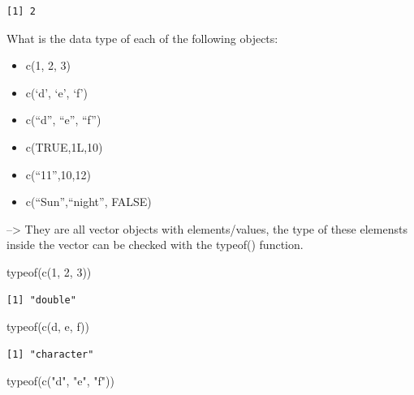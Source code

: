 \documentclass[
  letterpaper,
  DIV=11,
  numbers=noendperiod]{scrartcl}
\newenvironment{Shaded}{\begin{snugshade}}{\end{snugshade}}
\newcommand{\DecValTok}[1]{\textcolor[rgb]{0.68,0.00,0.00}{#1}}
\newcommand{\FunctionTok}[1]{\textcolor[rgb]{0.28,0.35,0.67}{#1}}
\newcommand{\NormalTok}[1]{\textcolor[rgb]{0.00,0.23,0.31}{#1}}
\newcommand{\StringTok}[1]{\textcolor[rgb]{0.13,0.47,0.30}{#1}}
\begin{document}
\begin{verbatim}
[1] 2
\end{verbatim}

What is the data type of each of the following objects:

\begin{itemize}
\item
  c(1, 2, 3)
\item
  c(`d', `e', `f')
\item
  c(``d'', ``e'', ``f'')
\item
  c(TRUE,1L,10)
\item
  c(``11'',10,12)
\item
  c(``Sun'',``night'', FALSE)
\end{itemize}

--\textgreater{} They are all vector objects with elements/values, the
type of these elemensts inside the vector can be checked with the
typeof() function.

\begin{Shaded}
\begin{Highlighting}[]
\FunctionTok{typeof}\NormalTok{(}\FunctionTok{c}\NormalTok{(}\DecValTok{1}\NormalTok{, }\DecValTok{2}\NormalTok{, }\DecValTok{3}\NormalTok{))}
\end{Highlighting}
\end{Shaded}

\begin{verbatim}
[1] "double"
\end{verbatim}

\begin{Shaded}
\begin{Highlighting}[]
\FunctionTok{typeof}\NormalTok{(}\FunctionTok{c}\NormalTok{(}\StringTok{\textquotesingle{}d\textquotesingle{}}\NormalTok{, }\StringTok{\textquotesingle{}e\textquotesingle{}}\NormalTok{, }\StringTok{\textquotesingle{}f\textquotesingle{}}\NormalTok{))}
\end{Highlighting}
\end{Shaded}

\begin{verbatim}
[1] "character"
\end{verbatim}

\begin{Shaded}
\begin{Highlighting}[]
\FunctionTok{typeof}\NormalTok{(}\FunctionTok{c}\NormalTok{(}\StringTok{"d"}\NormalTok{, }\StringTok{"e"}\NormalTok{, }\StringTok{"f"}\NormalTok{))}
\end{Highlighting}
\end{Shaded}
\end{document}
